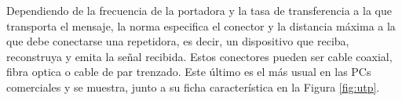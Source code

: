 
Dependiendo de la frecuencia de la portadora y la tasa de transferencia a la que transporta el mensaje, la norma especifica el conector y la distancia máxima a la que debe conectarse una repetidora, es decir, un dispositivo que reciba, reconstruya y emita la señal recibida. Estos conectores pueden ser cable coaxial, fibra optica o cable de par trenzado. Este último es el más usual en las PCs comerciales y se muestra, junto a su ficha característica en la Figura \ref{fig:utp}.\\

